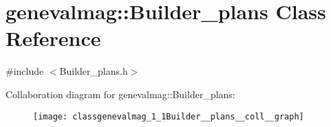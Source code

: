 \hypertarget{classgenevalmag_1_1Builder__plans}{
\section{genevalmag::Builder\_\-plans Class Reference}
\label{classgenevalmag_1_1Builder__plans}
}


{\ttfamily \#include $<$Builder\_\-plans.h$>$}



Collaboration diagram for genevalmag::Builder\_\-plans:\nopagebreak
\begin{figure}[H]
\begin{center}
\leavevmode
\texttt{[image: classgenevalmag\_1\_1Builder\_\_plans\_\_coll\_\_graph]}
\end{center}
\end{figure}
